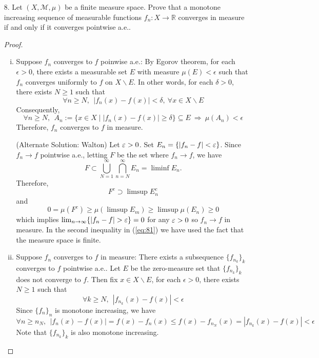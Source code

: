 \begin{itemize}
	\item[8.] Let $(X,\mathcal{M}, \mu)$ be a finite measure space. Prove that a monotone increasing sequence
	of measurable functions $f_n : X \rightarrow \mathbb{R}$ converges in measure if and only if it converges pointwise
	a.e..
	\begin{proof}
		\begin{enumerate}[(i)]
			\item Suppose $f_n$ converges to $f$ poinwise a.e.: By Egorov theorem, for each $\epsilon > 0$, there exists a measurable set $E$ with measure $\mu(E) < \epsilon$ such that $f_n$ converges uniformly to $f$ on $X\backslash E$. In other words, for each $\delta > 0$, there exists $N\ge 1$ such that 
			$$
			\forall n\ge N,~~ \lvert f_n(x) - f(x)\rvert < \delta, ~\forall x\in X\backslash E
			$$
			Consequently,
			$$
			\forall n\ge N,~~A_n:=\{x\in X \mid \lvert f_n(x) - f(x)\rvert \ge \delta\} \subseteq E ~\Rightarrow~ \mu(A_n) < \epsilon
			$$
			Therefore, $f_n$ converges to $f$ in measure.


			(Alternate Solution: Walton)
			Let $\varepsilon >0$. Set $E_n = \{|f_n-f| < \varepsilon\}$. Since $f_n \to f$ pointwise a.e., letting $F$ be the set where $f_n \to f$, we have
				\[ F \subset \bigcup_{N=1}^\infty \bigcap_{n=N}^\infty E_n = \liminf E_n. \]
			Therefore,
				\[ F^c \supset \limsup E_n^c\]
			and
				\begin{equation}\label{eq:81} 0 = \mu(F^c) \ge \mu(\limsup E_m) \ge \limsup \mu(E_n) \ge 0 \end{equation}
			which implies $\lim_{n \to \infty} \{ |f_n-f| > \varepsilon\} =0$ for any $\varepsilon>0$ so $f_n\to f$ in measure. In the second inequality in (\ref{eq:81}) we have used the fact that the measure space is finite.

			
			
			\item Suppose $f_n$ converges to $f$ in measure: There exists a subsequence $\{f_{n_k}\}_k$ converges to $f$ pointwise a.e.. Let $E$ be the zero-measure set that $\{f_{n_k}\}_k$ does not converge to $f$. Then
			fix $x\in X\backslash E$, for each $\epsilon > 0$, there exists $N\ge 1$ such that 
			$$
			\forall k\ge N,~~ |f_{n_k}(x) - f(x)|  < \epsilon
			$$
			Since $\{f_n\}_n$ is monotone increasing, we have
			$$
			\forall n\ge n_N,~~ |f_{n}(x) - f(x)| = f(x) - f_n(x) \le f(x) - f_{n_N}(x)  = |f_{n_k}(x) - f(x)|< \epsilon
			$$ 
			Note that $\{f_{n_k}\}_k$ is also monotone increasing. 
		\end{enumerate}
	\end{proof}


\end{itemize}
